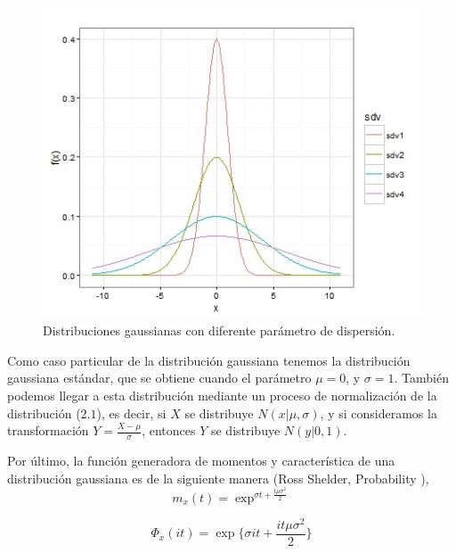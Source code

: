 \begin{figure}[ht]
	\centering
	\includegraphics[width=.8\linewidth]{Figuras/cambiosd}
	\caption{Distribuciones gaussianas con diferente parámetro de dispersión.}
	\label{fig:Ncambiosd}
\end{figure}

\pagebreak

Como caso particular de la distribución gaussiana tenemos la distribución gaussiana estándar, que se obtiene cuando el parámetro $\mu =0$, y $\sigma=1$. También podemos llegar a esta distribución mediante un proceso de normalización de la distribución ($2.1$), es decir, si $X$ se distribuye  $N(x|\mu,\sigma)$, y si consideramos la transformación $Y=\frac{X-\mu}{\sigma}$, entonces $Y$ se distribuye $N(y|0,1)$.

Por último, la función generadora de momentos y característica de una distribución gaussiana es de la siguiente manera (Ross Shelder, Probability ),
\begin{equation}
	m_{x}(t)=\exp^{\sigma t+\frac{t\mu\sigma^2}{2}}
\end{equation}

\begin{equation}
	\Phi_{x}(it)=\exp \{\sigma it+\frac{it\mu\sigma^2}{2} \}
\end{equation}


